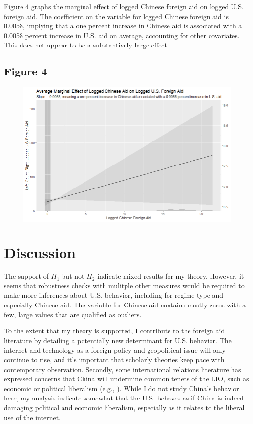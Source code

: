 \documentclass[12pt]{article}
\begin{document}
\pagebreak
Figure 4 graphs the marginal effect of logged Chinese foreign aid on logged U.S. foreign aid. The coefficient on the variable for logged Chinese foreign aid is 0.0058, implying that a one percent increase in Chinese aid is associated with a 0.0058 percent increase in U.S. aid on average, accounting for other covariates. This does not appear to be a substantively large effect.

\subsection*{Figure 4}
\begin{figure}[htbp]
    \includegraphics[scale=0.7]{Figures/628plot2.png}
\end{figure}
\pagebreak 

\section*{Discussion}
The support of $H_1$ but not $H_2$ indicate mixed results for my theory. However, it seems that robustness checks with mulitple other measures would be required to make more inferences about U.S. behavior, including for regime type and especially Chinese aid. The variable for Chinese aid contains mostly zeros with a few, large values that are qualified as outliers.

To the extent that my theory is supported, I contribute to the foreign aid literature by detailing a potentially new determinant for U.S. behavior. The internet and technology as a foreign policy and geopolitical issue will only continue to rise, and it's important that scholarly theories keep pace with contemporary observation. Secondly, some international relations literature has expressed concerns that China will undermine common tenets of the LIO, such as economic or political liberalism (e.g., \cite{weiss2021a}). While I do not study China's behavior here, my analysis indicate somewhat that the U.S. behaves as if China is indeed damaging political and economic liberalism, especially as it relates to the liberal use of the internet.
\end{document}
